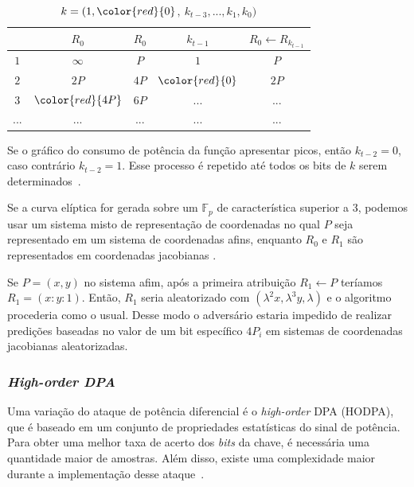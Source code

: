 \documentclass{SBCbookchapter}
\begin{document}
\begin{table}[htb]
\begin{center}
    \begin{tabular}{|c|c|c|c|c|}
	    \hline
		    \   & $R_{0}$  & $R_{0}$ & $k_{t-1}$ & $R_{0} \leftarrow R_{k_{t-1}}$\\
	    \hline
	        $1$ & $\infty$ &     $P$ &       $1$ & $P$\\
	    \hline
		    $2$ & $2P$ & $4P$ & $\color{red}{0}$ & $2P$ \\
	    \hline
		    $3$ & $\color{red}{4P}$ & $6P$ & ...& ... \\
	    \hline
		    ... & ... & ... & ...& ... \\
	    \hline
    \end{tabular}
\caption{$k = (1, \color{red}{0}$$,\ $$k_{t-3}, ..., k_{1}, k_{0})$}
\end{center}
\end{table}
Se o gr\'{a}fico do consumo de pot\^{e}ncia da fun\c{c}\~{a}o apresentar picos, ent\~{a}o $k_{t-2} = 0$, caso contr\'{a}rio $k_{t-2} = 1$.
Esse processo \'{e} repetido at\'{e} todos os bits de $k$ serem determinados~\cite{ECCBook_HankersonVanstone2004}.

Se a curva el\'{i}ptica for gerada sobre um $\mathbb{F}_{p}$ de caracter\'{i}stica superior a 3, podemos usar um sistema misto de representa\c{c}\~{a}o de coordenadas no qual $P$ seja representado em um sistema de coordenadas afins, enquanto $R_{0}$ e $R_{1}$ s\~{a}o~ representados em coordenadas jacobianas \cite{ECCBook_HankersonVanstone2004}.

Se $P = (x,y)$ no sistema afim, ap\'{o}s a primeira atribui\c{c}\~{a}o $R_{1} \leftarrow P$ ter\'{i}amos $ R_{1} = (x : y : 1)$. Ent\~{a}o, $R_{1}$ seria aleatorizado com $(\lambda^{2}x, \lambda^{3}y, \lambda)$ e o algoritmo procederia como o usual. Desse modo o advers\'{a}rio estaria impedido de realizar predi\c{c}\~{o}es baseadas no valor de um bit espec\'{i}fico $4P_{i}$ em sistemas de coordenadas jacobianas aleatorizadas.

\subsubsection{\emph{High-order DPA}}
Uma variação do ataque de potência diferencial é o \textit{high-order} DPA (HODPA), que é baseado em um conjunto de propriedades estatísticas do sinal de potência. Para obter uma melhor taxa de acerto dos \textit{bits} da chave, é necessária uma quantidade maior de amostras. Além disso, existe uma complexidade maior durante a implementação desse ataque~\cite{benedikt:2009:228}.
\end{document}
